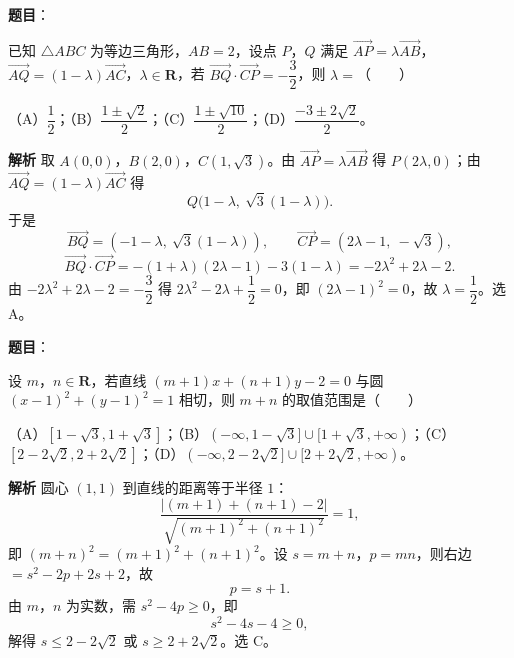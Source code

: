\begin{answer}

\textbf{题目}：

已知 $\triangle ABC$ 为等边三角形，$AB=2$，设点 $P$，$Q$ 满足 $\overrightarrow{AP}=\lambda\overrightarrow{AB}$，$\overrightarrow{AQ}=(1-\lambda)\overrightarrow{AC}$，$\lambda\in\mathbf R$，若 $\overrightarrow{BQ}\cdot\overrightarrow{CP}=-\dfrac32$，则 $\lambda=$\mbox{（　　）}

（A）$\dfrac12$；（B）$\dfrac{1\pm\sqrt2}2$；（C）$\dfrac{1\pm\sqrt{10}}2$；（D）$\dfrac{-3\pm2\sqrt2}2$。

\textbf{解析}
取 $A(0,0)$，$B(2,0)$，$C(1,\sqrt3)$。由 $\overrightarrow{AP}=\lambda\overrightarrow{AB}$ 得 $P(2\lambda,0)$；由 $\overrightarrow{AQ}=(1-\lambda)\overrightarrow{AC}$ 得
\nopagebreak[4]
\[Q\bigl(1-\lambda,\ \sqrt3(1-\lambda)\bigr).\]
于是
\nopagebreak[4]
\[\overrightarrow{BQ}=(-1-\lambda,\ \sqrt3(1-\lambda)),\qquad \overrightarrow{CP}=(2\lambda-1,\ -\sqrt3),\]
\nopagebreak[4]
\[\overrightarrow{BQ}\cdot\overrightarrow{CP}=-(1+\lambda)(2\lambda-1)-3(1-\lambda)=-2\lambda^2+2\lambda-2.\]
由 $-2\lambda^2+2\lambda-2=-\dfrac32$ 得 $2\lambda^2-2\lambda+\dfrac12=0$，即 $(2\lambda-1)^2=0$，故 $\lambda=\dfrac12$。选 A。


\end{answer}
\begin{answer}

\textbf{题目}：

设 $m$，$n\in\mathbf R$，若直线 $(m+1)x+(n+1)y-2=0$ 与圆 $(x-1)^2+(y-1)^2=1$ 相切，则 $m+n$ 的取值范围是\mbox{（　　）}

（A）$[1-\sqrt3,1+\sqrt3]$；（B）$(-\infty,1-\sqrt3]\cup[1+\sqrt3,+\infty)$；（C）$[2-2\sqrt2,2+2\sqrt2]$；（D）$(-\infty,2-2\sqrt2]\cup[2+2\sqrt2,+\infty)$。

\textbf{解析}
圆心 $(1,1)$ 到直线的距离等于半径 $1$：
\nopagebreak[4]
\[\frac{|(m+1)+(n+1)-2|}{\sqrt{(m+1)^2+(n+1)^2}}=1,\]
即 $(m+n)^2=(m+1)^2+(n+1)^2$。设 $s=m+n$，$p=mn$，则右边 $=s^2-2p+2s+2$，故
\nopagebreak[4]
\[p=s+1.\]
由 $m$，$n$ 为实数，需 $s^2-4p\geqslant0$，即
\nopagebreak[4]
\[s^2-4s-4\geqslant0,\]
解得 $s\leqslant2-2\sqrt2$ 或 $s\geqslant2+2\sqrt2$。选 C。


\end{answer}
